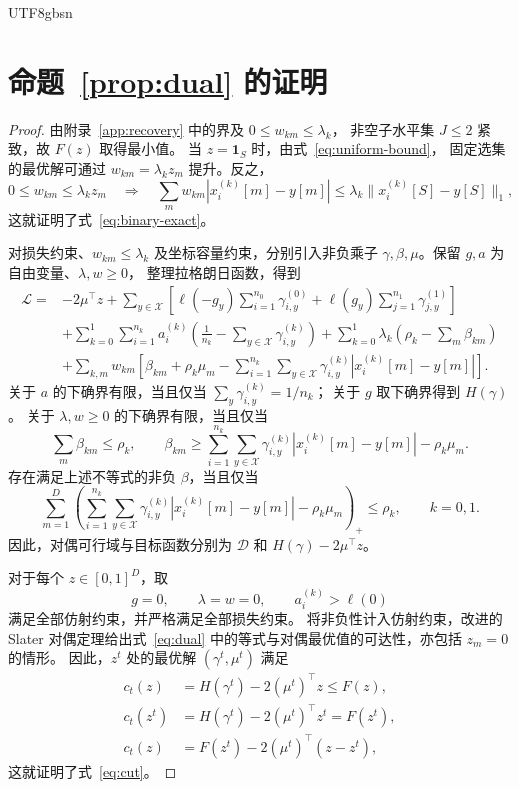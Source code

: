 \documentclass[11pt,a4paper]{article}
\theoremstyle{plain}
\begin{document}
\begin{CJK*}{UTF8}{gbsn}
\section{命题~\ref{prop:dual} 的证明}\label{app:dual}
\begin{proof}
由附录~\ref{app:recovery} 中的界及 $0\le w_{km}\le\lambda_k$，
非空子水平集 $J\le2$ 紧致，故 $F(z)$ 取得最小值。
当 $z=\mathbf1_S$ 时，由式~\eqref{eq:uniform-bound}，
固定选集的最优解可通过 $w_{km}=\lambda_kz_m$ 提升。反之，
\[
0\le w_{km}\le\lambda_kz_m
\quad\Longrightarrow\quad
\sum_m w_{km}|x_i^{(k)}[m]-y[m]|
\le\lambda_k\|x_i^{(k)}[S]-y[S]\|_1,
\]
这就证明了式~\eqref{eq:binary-exact}。

对损失约束、$w_{km}\le\lambda_k$ 及坐标容量约束，分别引入非负乘子
$\gamma,\beta,\mu$。保留 $g,a$ 为自由变量、$\lambda,w\ge0$，
整理拉格朗日函数，得到
\begin{equation}\label{eq:full-lagrangian}
\begin{aligned}
\mathcal L={}&-2\mu^\top z
+\sum_{y\in\mathcal X}\left[
\ell(-g_y)\sum_{i=1}^{n_0}\gamma_{i,y}^{(0)}
+\ell(g_y)\sum_{j=1}^{n_1}\gamma_{j,y}^{(1)}\right]\\
&+\sum_{k=0}^1\sum_{i=1}^{n_k}a_i^{(k)}
\left(\frac1{n_k}-\sum_{y\in\mathcal X}\gamma_{i,y}^{(k)}\right)
+\sum_{k=0}^1\lambda_k\left(\rho_k-\sum_m\beta_{km}\right)\\
&+\sum_{k,m}w_{km}\left[
\beta_{km}+\rho_k\mu_m
-\sum_{i=1}^{n_k}\sum_{y\in\mathcal X}
\gamma_{i,y}^{(k)}|x_i^{(k)}[m]-y[m]|\right].
\end{aligned}
\end{equation}
关于 $a$ 的下确界有限，当且仅当 $\sum_y\gamma_{i,y}^{(k)}=1/n_k$；
关于 $g$ 取下确界得到 $H(\gamma)$。
关于 $\lambda,w\ge0$ 的下确界有限，当且仅当
\[
\sum_m\beta_{km}\le\rho_k,\qquad
\beta_{km}\ge
\sum_{i=1}^{n_k}\sum_{y\in\mathcal X}
\gamma_{i,y}^{(k)}|x_i^{(k)}[m]-y[m]|-\rho_k\mu_m.
\]
存在满足上述不等式的非负 $\beta$，当且仅当
\[
\sum_{m=1}^D\left(
\sum_{i=1}^{n_k}\sum_{y\in\mathcal X}
\gamma_{i,y}^{(k)}|x_i^{(k)}[m]-y[m]|-\rho_k\mu_m
\right)_+\le\rho_k,\qquad k=0,1.
\]
因此，对偶可行域与目标函数分别为 $\mathcal D$ 和 $H(\gamma)-2\mu^\top z$。

对于每个 $z\in[0,1]^D$，取
\[
g=0,\qquad \lambda=w=0,\qquad a_i^{(k)}>\ell(0)
\]
满足全部仿射约束，并严格满足全部损失约束。
将非负性计入仿射约束，改进的 Slater 对偶定理给出式~\eqref{eq:dual}
中的等式与对偶最优值的可达性，亦包括 $z_m=0$ 的情形。
因此，$z^t$ 处的最优解 $(\gamma^t,\mu^t)$ 满足
\[
\begin{aligned}
c_t(z)&=H(\gamma^t)-2(\mu^t)^\top z\le F(z),\\
c_t(z^t)&=H(\gamma^t)-2(\mu^t)^\top z^t=F(z^t),\\
c_t(z)&=F(z^t)-2(\mu^t)^\top(z-z^t),
\end{aligned}
\]
这就证明了式~\eqref{eq:cut}。
\end{proof}

\clearpage


\end{CJK*}
\end{document}
